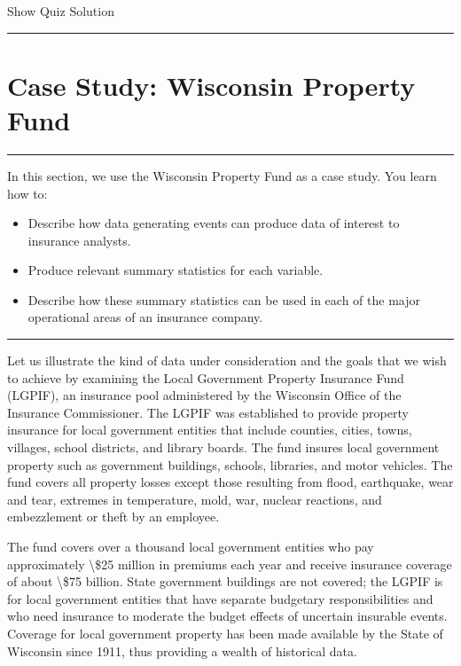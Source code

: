 \documentclass[]{book}
\providecommand{\tightlist}{%
  \setlength{\itemsep}{0pt}\setlength{\parskip}{0pt}}
\theoremstyle{definition}
\theoremstyle{definition}
\theoremstyle{definition}
\theoremstyle{remark}
\begin{document}
\hypertarget{surveyElement12}{}

\hypertarget{surveyResult12}{}

Show Quiz Solution

\hypertarget{display.Quiz12.2}{}
\begin{center}\rule{0.5\linewidth}{\linethickness}\end{center}

\section{Case Study: Wisconsin Property Fund}\label{S:LGPIF}

\begin{center}\rule{0.5\linewidth}{\linethickness}\end{center}

In this section, we use the Wisconsin Property Fund as a case study. You
learn how to:

\begin{itemize}
\tightlist
\item
  Describe how data generating events can produce data of interest to
  insurance analysts.
\item
  Produce relevant summary statistics for each variable.
\item
  Describe how these summary statistics can be used in each of the major
  operational areas of an insurance company.
\end{itemize}

\begin{center}\rule{0.5\linewidth}{\linethickness}\end{center}

Let us illustrate the kind of data under consideration and the goals
that we wish to achieve by examining the Local Government Property
Insurance Fund (LGPIF), an insurance pool administered by the Wisconsin
Office of the Insurance Commissioner. The LGPIF was established to
provide property insurance for local government entities that include
counties, cities, towns, villages, school districts, and library boards.
The fund insures local government property such as government buildings,
schools, libraries, and motor vehicles. The fund covers all property
losses except those resulting from flood, earthquake, wear and tear,
extremes in temperature, mold, war, nuclear reactions, and embezzlement
or theft by an employee.

The fund covers over a thousand local government entities who pay
approximately \textbackslash{}\$25 million in premiums each year and
receive insurance coverage of about \textbackslash{}\$75 billion. State
government buildings are not covered; the LGPIF is for local government
entities that have separate budgetary responsibilities and who need
insurance to moderate the budget effects of uncertain insurable events.
Coverage for local government property has been made available by the
State of Wisconsin since 1911, thus providing a wealth of historical
data.
\end{document}
